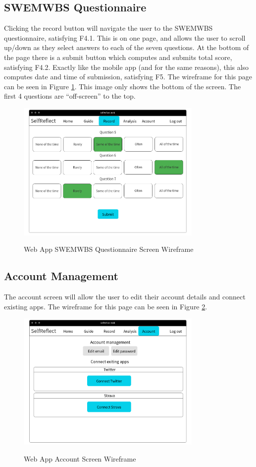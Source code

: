 \documentclass[11pt,openright,a4paper]{report}
\begin{document}
\subsection{SWEMWBS Questionnaire}
Clicking the record button will navigate the user to the SWEMWBS questionnaire, satisfying F4.1. This is on one page, and allows the user to scroll up/down as they select answers to each of the seven questions. At the bottom of the page there is a submit button which computes and submits total score, satisfying F4.2. Exactly like the mobile app (and for the same reasons), this also computes date and time of submission, satisfying F5. The wireframe for this page can be seen in Figure \ref{fig:webrecord}. This image only shows the bottom of the screen. The first 4 questions are \enquote{off-screen} to the top.

\begin{figure}[ht]
\centering
\caption{Web App SWEMWBS Questionnaire Screen Wireframe}
\includegraphics[width=0.8\textwidth]{i/webrecord.png}
\label{fig:webrecord}
\end{figure}

\subsection{Account Management} \label{sec:webaccman}
The account screen will allow the user to edit their account details and connect existing apps. The wireframe for this page can be seen in Figure \ref{fig:webaccount}.

\begin{figure}[ht]
\centering
\caption{Web App Account Screen Wireframe}
\includegraphics[width=0.8\textwidth]{i/webaccount.png}
\label{fig:webaccount}
\end{figure}
\end{document}
